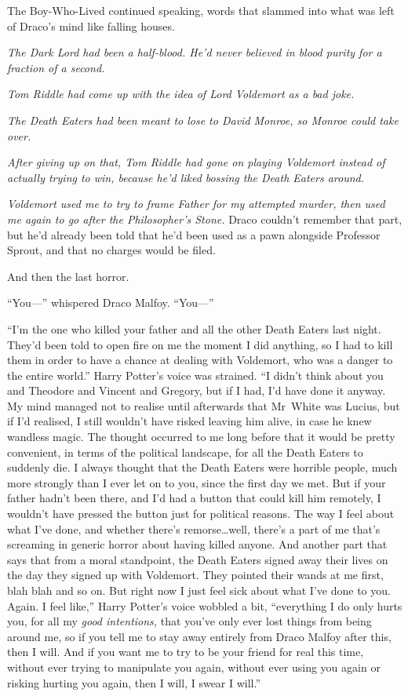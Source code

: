 The Boy-Who-Lived continued speaking, words that slammed into what was left of Draco’s mind like falling houses.

\emph{The Dark Lord had been a half-blood. He’d never believed in blood purity for a fraction of a second.}

\emph{Tom Riddle had come up with the idea of Lord Voldemort as a bad joke.}

\emph{The Death Eaters had been meant to lose to David Monroe, so Monroe could take over.}

\emph{After giving up on that, Tom Riddle had gone on playing Voldemort instead of actually trying to win, because he’d liked bossing the Death Eaters around.}

\emph{Voldemort used me to try to frame Father for my attempted murder, then used me again to go after the Philosopher’s Stone.} Draco couldn’t remember that part, but he’d already been told that he’d been used as a pawn alongside Professor Sprout, and that no charges would be filed.

And then the last horror.

“You—” whispered Draco Malfoy. “You—”

“I’m the one who killed your father and all the other Death Eaters last night. They’d been told to open fire on me the moment I did anything, so I had to kill them in order to have a chance at dealing with Voldemort, who was a danger to the entire world.” Harry Potter’s voice was strained. “I didn’t think about you and Theodore and Vincent and Gregory, but if I had, I’d have done it anyway. My mind managed not to realise until afterwards that Mr~White was Lucius, but if I’d realised, I still wouldn’t have risked leaving him alive, in case he knew wandless magic. The thought occurred to me long before that it would be pretty convenient, in terms of the political landscape, for all the Death Eaters to suddenly die. I always thought that the Death Eaters were horrible people, much more strongly than I ever let on to you, since the first day we met. But if your father hadn’t been there, and I’d had a button that could kill him remotely, I wouldn’t have pressed the button just for political reasons. The way I feel about what I’ve done, and whether there’s remorse…well, there’s a part of me that’s screaming in generic horror about having killed anyone. And another part that says that from a moral standpoint, the Death Eaters signed away their lives on the day they signed up with Voldemort. They pointed their wands at me first, blah blah and so on. But right now I just feel sick about what I’ve done to you. Again. I feel like,” Harry Potter’s voice wobbled a bit, “everything I do only hurts you, for all my \emph{good intentions,} that you’ve only ever lost things from being around me, so if you tell me to stay away entirely from Draco Malfoy after this, then I will. And if you want me to try to be your friend for real this time, without ever trying to manipulate you again, without ever using you again or risking hurting you again, then I will, I swear I will.”

